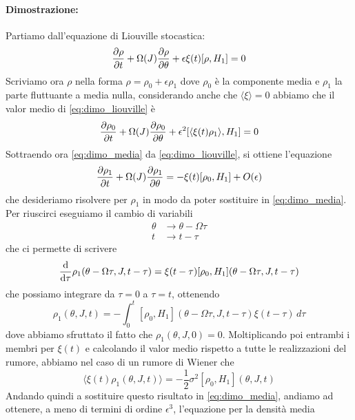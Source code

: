 \documentclass[10pt,a4paper]{article}
\begin{document}
\paragraph{Dimostrazione:}
Partiamo dall'equazione di Liouville stocastica:
\begin{equation}
	\pdv{\rho}{t} + \Omega(J) \pdv{\rho}{\theta} + \epsilon\xi(t)[\rho,H_1] = 0
	\label{eq:dimo_liouville}
\end{equation}
Scriviamo ora \(\rho\) nella forma \(\rho = \rho_0 + \epsilon\rho_1\) dove \(\rho_0\) è la componente media e \(\rho_1\) la parte fluttuante a media nulla, considerando anche che \(\langle\xi\rangle = 0\) abbiamo che il valor medio di \eqref{eq:dimo_liouville} è
\begin{equation}
	\pdv{\rho_0}{t} + \Omega(J)\pdv{\rho_0}{\theta} + \epsilon^2[\langle\xi(t)\rho_1\rangle, H_1] = 0
	\label{eq:dimo_media}
\end{equation}
Sottraendo ora \eqref{eq:dimo_media} da \eqref{eq:dimo_liouville}, si ottiene l'equazione
\begin{equation}
	\pdv{\rho_1}{t} + \Omega(J) \pdv{\rho_1}{\theta} = -\xi(t)[\rho_0, H_1] + O(\epsilon)
\end{equation}
che desideriamo risolvere per \(\rho_1\) in modo da poter sostituire in \eqref{eq:dimo_media}. Per riuscirci eseguiamo il cambio di variabili
\begin{align}
	\theta &\to \theta - \Omega \tau \\
	t &\to t - \tau
\end{align}
che ci permette di scrivere
\begin{equation}
	\dv{}{\tau}\rho_1(\theta - \Omega \tau, J, t - \tau) = \xi(t- \tau)[\rho_0, H_1](\theta - \Omega \tau, J, t - \tau)
\end{equation}
che possiamo integrare da \(\tau = 0\) a \(\tau = t\), ottenendo
\begin{equation}
	\rho_1(\theta, J, t) = -\int_0^t[\rho_0, H_1](\theta - \Omega \tau, J, t - \tau)\xi(t-\tau)\,d\tau
\end{equation}
dove abbiamo sfruttato il fatto che \(\rho_1(\theta, J, 0)=0\). Moltiplicando poi entrambi i membri per \(\xi(t)\) e calcolando il valor medio rispetto a tutte le realizzazioni del rumore, abbiamo nel caso di un rumore di Wiener che
\begin{equation}
	\langle \xi(t)\rho_1(\theta, J, t) \rangle = -\frac{1}{2}\sigma^2 [\rho_0, H_1](\theta, J, t)
\end{equation}
Andando quindi a sostituire questo risultato in \eqref{eq:dimo_media}, andiamo ad ottenere, a meno di termini di ordine \(\epsilon^3\), l'equazione per la densità media
\end{document}
